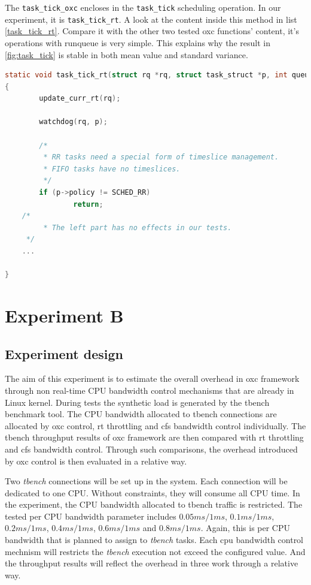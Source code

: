 The \texttt{task\_tick\_oxc} encloses in the \texttt{task\_tick} scheduling
operation. In our experiment, it is \texttt{task\_tick\_rt}. A look at 
the content inside this method in list \ref{task_tick_rt}. Compare it 
with the other two tested oxc functions' content, it's operations with
runqueue is very simple. This explains why the result in \ref{fig:task_tick}
is stable in both mean value and standard variance.
\begin{lstlisting}[language=C,
			caption={\texttt{task\_tick\_rt}},
			label={task_tick_rt}]
static void task_tick_rt(struct rq *rq, struct task_struct *p, int queued)
{
        update_curr_rt(rq);

        watchdog(rq, p);

        /*
         * RR tasks need a special form of timeslice management.
         * FIFO tasks have no timeslices.
         */
        if (p->policy != SCHED_RR)
                return;
	/*
         * The left part has no effects in our tests.
	 */
	...

}
\end{lstlisting}



\section{Experiment B}
\subsection{Experiment design}
The aim of this experiment is to estimate the overall overhead in oxc 
framework through non real-time CPU bandwidth control mechanisms that 
are already in Linux kernel.
During tests the synthetic load is generated by the tbench benchmark tool.
The CPU bandwidth allocated to tbench connections are allocated by oxc 
control, rt throttling and cfs bandwidth control individually. 
The tbench throughput results of oxc framework are then compared with 
rt throttling and cfs bandwidth control. Through such comparisons, the 
overhead introduced by oxc control is then evaluated in a relative way.

Two \emph{tbench} connections will be set up in the system.
Each connection will be dedicated to one CPU.
Without constraints, they will consume all CPU time.
In the experiment, the CPU bandwidth allocated to tbench traffic is restricted.
The tested per CPU bandwidth parameter includes
$0.05ms/1ms$, $0.1ms/1ms$, $0.2ms/1ms$, $0.4ms/1ms$, $0.6ms/1ms$ and 
$0.8ms/1ms$. 
Again, this is per CPU bandwidth that is planned to assign to \emph{tbench}
tasks. Each cpu bandwidth control mechnism will restricts the \emph{tbench}
execution not exceed the configured value. And the throughput results will
reflect the overhead in three work through a relative way.


